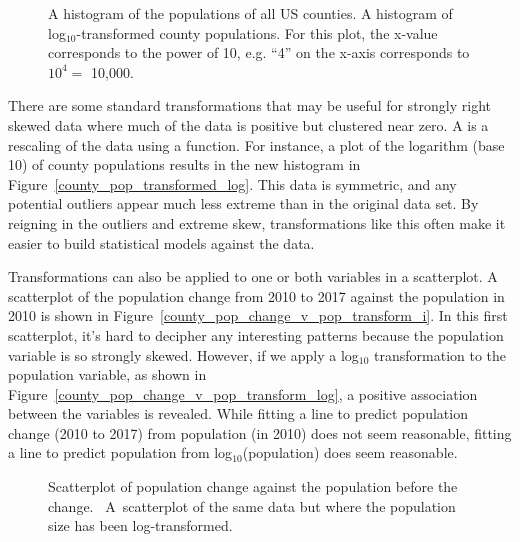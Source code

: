 \begin{figure}[ht]
    \label{county_pop_transformed}
  \centering
  \caption{ A histogram of
      the populations of all US counties.
       A histogram of
      log$_{10}$-transformed county populations.
      For this plot, the x-value corresponds to the power
      of 10, e.g. ``4'' on the x-axis corresponds to
      $10^4 =$ 10,000.}
\end{figure}





There are some standard transformations that may be
useful for strongly right skewed data where much of the
data is positive but clustered near zero.
A  is a rescaling of the data
using a function.
For instance, a plot of the logarithm (base 10) of
county populations results in the new histogram in
Figure~\ref{county_pop_transformed_log}.
This data is symmetric, and any potential outliers
appear much less extreme than in the original data set.
By reigning in the outliers and extreme skew,
transformations like this often make it easier to build
statistical models against the data.


Transformations can also be applied to one or both
variables in a scatterplot.
A scatterplot of the population change from 2010 to 2017
against the population in 2010 is shown in Figure~\ref{county_pop_change_v_pop_transform_i}.
In this first scatterplot, it's hard to decipher any
interesting patterns because the population variable
is so strongly skewed.
However, if we apply a log$_{10}$ transformation to
the population variable, as shown in
Figure~\ref{county_pop_change_v_pop_transform_log},
a positive association between the variables is revealed.
While fitting a line to predict population change (2010 to 2017) from population (in 2010) does not seem reasonable, fitting a line to predict population from log$_{10}$(population) does seem reasonable.  



\begin{figure}
  \centering
  \caption{
      Scatterplot of population change
      against the population before the change.
      ~A~scatterplot
      of the same data but where the population
      size has been log-transformed.}
  \label{county_pop_change_v_pop_transform_main}
\end{figure}


